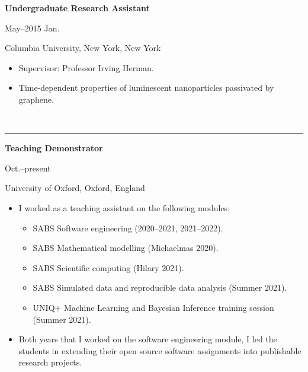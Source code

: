 \documentclass[11pt]{article}
\begin{document}
\noindent\parbox{.75\textwidth}{\raggedright \textbf{Undergraduate Research Assistant}}
\parbox{.25\textwidth}{ May--2015 Jan.}
Columbia University, New York, New York
\vspace{-.25cm}
\begin{itemize}
\item Supervisor: Professor Irving Herman.
\vspace{-.3cm}
\item Time-dependent properties of luminescent nanoparticles passivated by graphene.
\end{itemize}

\vspace{0.6cm}


\vspace{-2.75mm} \\
\rule{\textwidth}{0.4pt}
\vspace{0.1mm}
\noindent\parbox{.75\textwidth}{\raggedright \textbf{Teaching Demonstrator}}
\parbox{.25\textwidth}{ Oct.--present}
University of Oxford, Oxford, England
\vspace{-.25cm}
\begin{itemize}
\setlength{\itemsep}{4pt}
\setlength{\parskip}{0pt}
\setlength{\parsep}{0pt}
\item I worked as a teaching assistant on the following modules:
\begin{itemize}
\setlength{\itemsep}{0pt}
\item SABS Software engineering (2020--2021, 2021--2022).
\item SABS Mathematical modelling (Michaelmas 2020).
\item SABS Scientific computing (Hilary 2021).
\item SABS Simulated data and reproducible data analysis (Summer 2021).
\item UNIQ+ Machine Learning and Bayesian Inference training session (Summer 2021).
\end{itemize}
\item Both years that I worked on the software engineering module, I led the students in extending their open source software assignments into publishable research projects.
\end{itemize}



\vspace{0.2cm}
\end{document}
